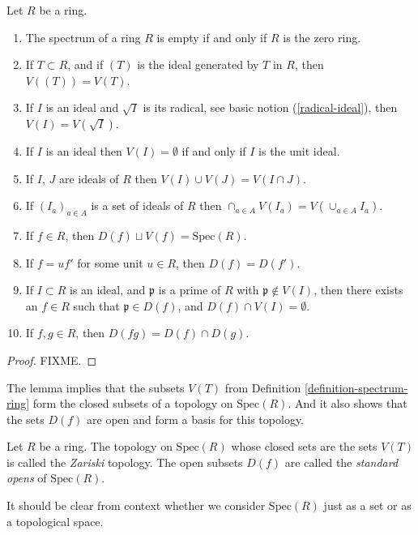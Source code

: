 \begin{lemma}
\label{lemma-Zariski-topology}
Let $R$ be a ring.
\begin{enumerate}
\item The spectrum of a ring $R$ is empty if and only if $R$
is the zero ring.
\item If $T \subset R$, and if $(T)$ is the ideal generated by
$T$ in $R$, then $V((T)) = V(T)$.
\item If $I$ is an ideal and $\sqrt{I}$ is its radical,
see basic notion (\ref{radical-ideal}), then $V(I) = V(\sqrt{I})$.
\item If $I$ is an ideal then $V(I) = \emptyset$ if and only
if $I$ is the unit ideal.
\item If $I$, $J$ are ideals of $R$ then $V(I) \cup V(J) =
V(I \cap J)$.
\item If $(I_a)_{a\in A}$ is a set of ideals of $R$ then
$\cap_{a\in A} V(I_a) = V(\cup_{a\in A} I_a)$.
\item If $f \in R$, then $D(f) \sqcup V(f) = \text{Spec}(R)$.
\item If $f = u f'$ for some unit $u \in R$, then $D(f) = D(f')$.
\item If $I \subset R$ is an ideal, and $\mathfrak p$ is a prime of
$R$ with $\mathfrak p \not\in V(I)$, then there exists an $f \in R$
such that $\mathfrak p \in D(f)$, and $D(f) \cap V(I) = \emptyset$.
\item If $f,g \in R$, then $D(fg) = D(f) \cap D(g)$.
\end{enumerate}
\end{lemma}

\begin{proof}
FIXME.
\end{proof}

\noindent
The lemma implies that the subsets $V(T)$ from
Definition \ref{definition-spectrum-ring} form the closed
subsets of a topology on $\text{Spec}(R)$. And it also shows that
the sets $D(f)$ are open and form a basis for this
topology.

\begin{definition}
\label{definition-Zariski-topology}
Let $R$ be a ring.
The topology on $\text{Spec}(R)$ whose closed sets are the
sets $V(T)$ is called the {\it Zariski} topology. The open
subsets $D(f)$ are called the {\it standard opens} of $\text{Spec}(R)$.
\end{definition}

\noindent
It should be clear from context whether we consider $\text{Spec}(R)$
just as a set or as a topological space.

